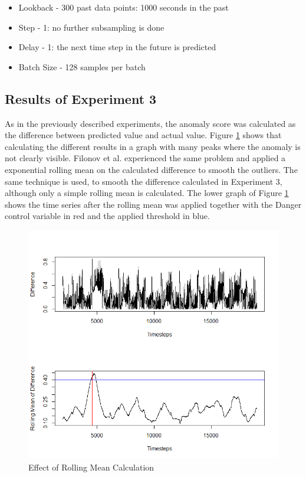 \begin{itemize}
	\item Lookback - 300 past data points: 1000 seconds in the past
	\item Step - 1: no further subsampling is done
	\item Delay - 1: the next time step in the future is predicted
	\item Batch Size - 128 samples per batch
\end{itemize}

\subsection{Results of Experiment 3}
As in the previously described experiments, the anomaly score was calculated as the difference between predicted value and actual value. Figure \ref{fig:rollmean} shows that calculating the different results in a graph with many peaks where the anomaly is not clearly visible. Filonov et al. \parencite*{Filonov2016} experienced the same problem and applied a exponential rolling mean on the calculated difference to smooth the outliers. The same technique is used, to smooth the difference calculated in Experiment 3, although only a simple rolling mean is calculated. The lower graph of Figure \ref{fig:rollmean} shows the time series after the rolling mean was applied together with the Danger control variable in red and the applied threshold in blue.

\begin{figure}[h]
	\centering
	\includegraphics[scale=0.7]{Figures/Rollmean}
	\decoRule
	\caption[Effect of Rolling Mean Calculation]{Effect of Rolling Mean Calculation \parencite{Own}}
	\label{fig:rollmean}
\end{figure}

